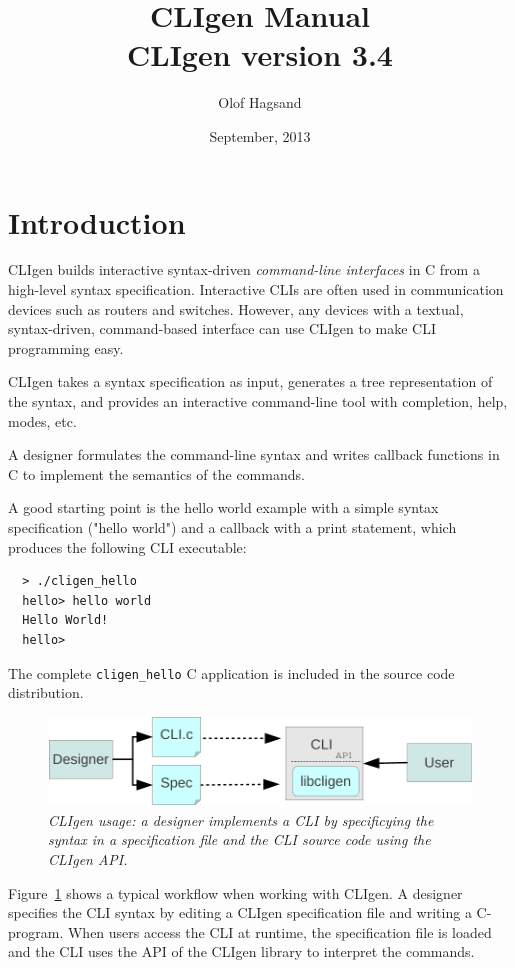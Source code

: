 \documentclass[a4paper, 10pt] {article}
\title {CLIgen Manual\\ {\small CLIgen version 3.4}}
\author{Olof Hagsand}
\begin{document}
\date{September, 2013}
\maketitle
\setcounter{tocdepth}{2}
\tableofcontents
\newpage
\section{Introduction}
\label{sec:intro}

CLIgen builds interactive syntax-driven \emph{command-line interfaces}
in C from a high-level syntax specification. Interactive CLIs are
often used in communication devices such as routers and
switches. However, any devices with a textual, syntax-driven,
command-based interface can use CLIgen to make CLI programming easy.

CLIgen takes a syntax specification as input, generates a tree
representation of the syntax, and provides an interactive command-line
tool with completion, help, modes, etc.

A designer formulates the command-line syntax and writes callback
functions in C to implement the semantics of the commands.

A good starting point is the hello world example with a simple syntax
specification ("hello world") and a callback with a print statement,
which produces the following CLI executable:

\begin{verbatim}
  > ./cligen_hello 
  hello> hello world 
  Hello World!
  hello> 
\end{verbatim}

The complete {\tt cligen\_hello} C application is included in the
source code distribution.

\begin{figure}
\centering
\includegraphics[scale=0.8]{usage.pdf}
\caption{\em CLIgen usage: a designer implements a CLI by specificying the syntax in a specification file and the CLI source code using the CLIgen API.}
\label{fig:usage}
\end{figure}

Figure~\ref{fig:usage} shows a typical workflow when working with
CLIgen. A designer specifies the CLI syntax by editing a CLIgen
specification file and writing a C-program. When users access the CLI
at runtime, the specification file is loaded and the CLI uses the API
of the CLIgen library to interpret the commands.
\end{document}
